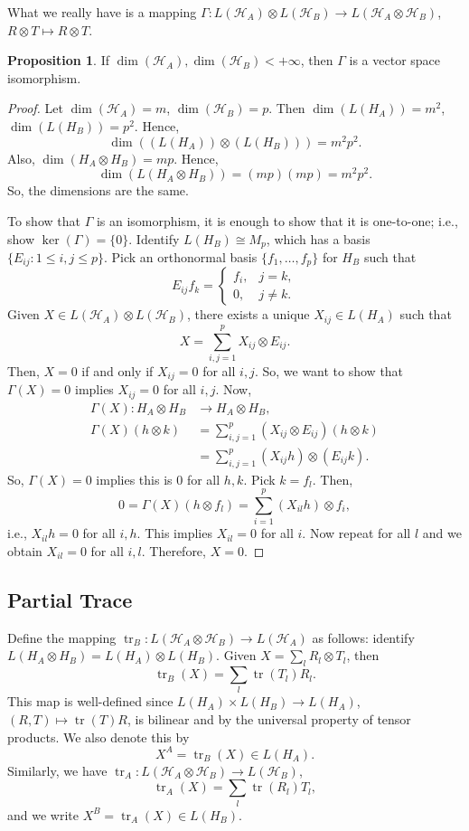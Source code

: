 \documentclass[12pt]{article}
\theoremstyle{definition}
\newtheorem*{proposition}{Proposition}
\DeclareMathOperator{\tr}{tr}
\begin{document}
What we really have is a mapping $\Gamma : L(\mathcal{H}_A) \otimes L(\mathcal{H}_B) \to L(\mathcal{H}_A \otimes \mathcal{H}_B)$, $R \otimes T \mapsto R \otimes T$.

\begin{proposition}
If $\dim(\mathcal{H}_A), \dim(\mathcal{H}_B) < +\infty$, then $\Gamma$ is a vector space isomorphism.
\end{proposition}

\begin{proof}
Let $\dim(\mathcal{H}_A)=m$, $\dim(\mathcal{H}_B)=p$. Then $\dim(L(H_A))=m^2$, $\dim(L(H_B))=p^2$. Hence,
\[
\dim((L(H_A)) \otimes (L(H_B))) = m^2p^2.
\]
Also, $\dim(H_A \otimes H_B)=mp$. Hence,
\[
\dim(L(H_A \otimes H_B))=(mp)(mp)=m^2p^2.
\]
So, the dimensions are the same.

To show that $\Gamma$ is an isomorphism, it is enough to show that it is one-to-one; i.e., show $\ker(\Gamma)=\{0\}$. Identify $L(H_B) \cong M_p$, which has a basis $\{E_{ij}:1\leq i,j\leq p\}$. Pick an orthonormal basis $\{f_1,\ldots,f_p\}$ for $H_B$ such that
\[
E_{ij}f_k = \begin{cases}f_i, & j=k,\\0, & j\neq k.\end{cases}
\]
Given $X \in L(\mathcal{H}_A) \otimes L(\mathcal{H}_B)$, there exists a unique $X_{ij} \in L(H_A)$ such that
\[
X = \sum_{i,j=1}^p X_{ij} \otimes E_{ij}.
\]
Then, $X=0$ if and only if $X_{ij}=0$ for all $i,j$. So, we want to show that $\Gamma(X)=0$ implies $X_{ij}=0$ for all $i,j$. Now,
\begin{align*}
\Gamma(X):H_A \otimes H_B &\to H_A \otimes H_B, \\
\Gamma(X)(h \otimes k) &= \sum_{i,j=1}^p (X_{ij} \otimes E_{ij})(h \otimes k) \\
&= \sum_{i,j=1}^p (X_{ij}h) \otimes (E_{ij}k).
\end{align*}
So, $\Gamma(X)=0$ implies this is $0$ for all $h,k$. Pick $k=f_l$. Then,
\[
0 = \Gamma(X)(h \otimes f_l) = \sum_{i=1}^p (X_{il}h) \otimes f_i,
\]
i.e., $X_{il}h=0$ for all $i,h$. This implies $X_{il}=0$ for all $i$. Now repeat for all $l$ and we obtain $X_{il}=0$ for all $i,l$. Therefore, $X=0$.
\end{proof}

\subsection{Partial Trace}

Define the mapping $\tr_B : L(\mathcal{H}_A \otimes \mathcal{H}_B) \to L(\mathcal{H}_A)$ as follows: identify $L(H_A \otimes H_B)=L(H_A) \otimes L(H_B)$. Given $X=\sum_l R_l \otimes T_l$, then
\[
\tr_B(X) = \sum_l \tr(T_l)R_l.
\]
This map is well-defined since $L(H_A) \times L(H_B) \to L(H_A)$, $(R,T) \mapsto \tr(T)R$, is bilinear and by the universal property of tensor products. We also denote this by
\[
X^A = \tr_B(X) \in L(H_A).
\]
Similarly, we have $\tr_A : L(\mathcal{H}_A \otimes \mathcal{H}_B) \to L(\mathcal{H}_B)$,
\[
\tr_A(X) = \sum_l \tr(R_l)T_l,
\]
and we write $X^B = \tr_A(X) \in L(H_B)$.
\end{document}
